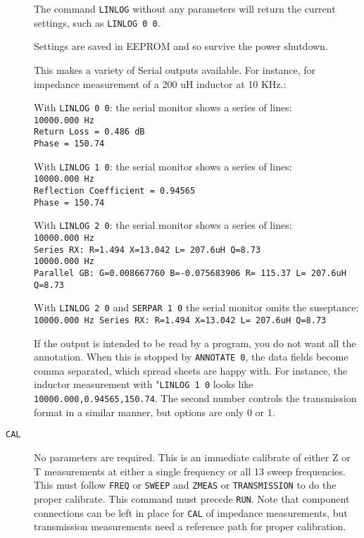 \begin{description}
   The command \texttt{LINLOG} without any parameters will return the current settings, such as \texttt{LINLOG 0 0}.

   Settings are saved in EEPROM and so survive the power shutdown.

   This makes a variety of Serial outputs available.  For instance, for impedance measurement of a 200 uH inductor at
   10 KHz.:

    With \texttt{LINLOG 0 0}:  the serial monitor shows a series of lines:
      \\ \texttt{10000.000 Hz\\ Return Loss = 0.486 dB\\  Phase = 150.74}

    With \texttt{LINLOG 1 0}:  the serial monitor shows a series of lines:
      \\ \texttt{10000.000 Hz\\ Reflection Coefficient = 0.94565\\  Phase = 150.74}

    With \texttt{LINLOG 2 0}:  the serial monitor shows a series of lines:
      \\ \texttt{10000.000 Hz\\ Series RX: R=1.494 X=13.042 L= 207.6uH Q=8.73}
      \\ \texttt{10000.000 Hz\\ Parallel GB: G=0.008667760 B=-0.075683906 R= 115.37 L= 207.6uH Q=8.73}

    With \texttt{LINLOG 2 0} and \texttt{SERPAR 1 0} the serial monitor omits the suseptance:
      \\ \texttt{10000.000 Hz Series RX: R=1.494 X=13.042 L= 207.6uH Q=8.73}

    If the output is intended to be read by a program, you do not want all the annotation.  When this is stopped by
    \texttt{ANNOTATE 0}, the data fields become comma separated, which spread sheets are happy with.  For instance, the inductor
    measurement with "\texttt{LINLOG 1 0} looks like
      \texttt{10000.000,0.94565,150.74}.
    The second number controls the transmission format in a similar manner, but options are only 0 or 1.

\item[\texttt{CAL}]
No parameters are required.  This is an immediate calibrate of either Z or T measurements at either a single frequency or all 13 sweep frequencies.  This must follow \texttt{FREQ} or \texttt{SWEEP} and \texttt{ZMEAS} or \texttt{TRANSMISSION} to do the proper calibrate.  This command must precede \texttt{RUN}.  Note that component connections can be left in place for \texttt{CAL} of impedance measurements, but transmission measurements need a reference path for proper calibration.


\end{description}
